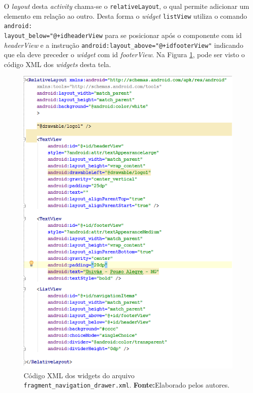 	\par O \textit{layout} desta \textit{activity} chama-se o
\texttt{relativeLayout}, o qual permite adicionar um elemento em relação ao
outro. Desta forma o \textit{widget} \texttt{listView} utiliza o comando
\texttt{android:\\layout\_below="@+id\/headerView} para se posicionar após o
componente com id \textit{headerView} e a instrução
\texttt{android:layout\_above="@+id\/footerView"} indicando que ela deve
preceder o \textit{widget} com id \textit{footerView}. Na Figura \ref{fig:app},
pode ser visto o código XML dos \textit{widgets} desta tela.

	\begin{figure}[h!] 
		\centerline{\includegraphics[scale=0.8]{./imagens/2_q_metodologico/4_procedimentos_resultados/42_aplicativo/app.png}}
		\caption[Código XML dos widgets do arquivo
		fragment\_navigation\_drawer.xml]{Código XML dos widgets do arquivo
		\texttt{fragment\_navigation\_drawer.xml}.
		\textbf{Fonte:}Elaborado pelos autores.}
		\label{fig:app}
	\end{figure}
	
